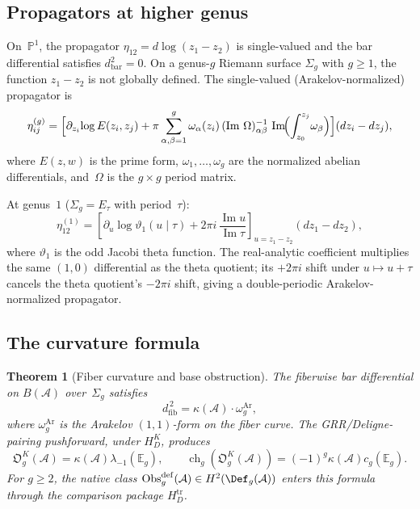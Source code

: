 \documentclass[11pt,reqno]{amsart}
\newtheorem{theorem}{Theorem}[section]
\theoremstyle{definition}
\theoremstyle{remark}
\newcommand{\cA}{\mathcal{A}}
\newcommand{\dfib}{d_{\mathrm{fib}}}
\DeclareMathOperator{\im}{Im}
\numberwithin{equation}{section}
\begin{document}
\subsection{Propagators at higher genus}

On~$\mathbb{P}^1$, the propagator
$\eta_{12} = d\log(z_1 - z_2)$ is single-valued and the bar
differential satisfies $d_{\mathrm{bar}}^2 = 0$. On a
genus-$g$ Riemann surface $\Sigma_g$ with $g \ge 1$, the
function $z_1 - z_2$ is not globally defined. The
single-valued (Arakelov-normalized) propagator is
\begin{equation}\label{eq:propagator-g}
\eta^{(g)}_{ij} = \Bigl[\partial_{z_i}\!\log E(z_i,z_j)
+ \pi\sum_{\alpha,\beta=1}^{g}
\omega_\alpha(z_i)\,(\im\,\Omega)^{-1}_{\alpha\beta}\,
\im\!\Bigl(\int_{z_0}^{z_j}\!\omega_\beta\Bigr)
\Bigr](dz_i - dz_j),
\end{equation}
where $E(z,w)$ is the prime form, $\omega_1,\ldots,\omega_g$
are the normalized abelian differentials, and~$\Omega$ is the
$g\times g$ period matrix.

At genus~$1$ ($\Sigma_g = E_\tau$ with period~$\tau$):
\begin{equation}\label{eq:propagator-1}
\eta^{(1)}_{12}
=
\left[
\partial_u\log\vartheta_1(u\mid\tau)
+2\pi i\,\frac{\im u}{\im\tau}
\right]_{u=z_1-z_2}
(dz_1-dz_2),
\end{equation}
where $\vartheta_1$ is the odd Jacobi theta function. The
real-analytic coefficient multiplies the same $(1,0)$ differential as
the theta quotient; its $+2\pi i$ shift under $u\mapsto u+\tau$
cancels the theta quotient's $-2\pi i$ shift, giving a
double-periodic Arakelov-normalized propagator.

\subsection{The curvature formula}

\begin{theorem}[Fiber curvature and base obstruction]\label{thm:curvature}
The fiberwise bar differential on $B(\cA)$ over~$\Sigma_g$
satisfies
\begin{equation}\label{eq:curvature}
\dfib^{\,2} = \kappa(\cA)\cdot\omega_g^{\mathrm{Ar}},
\end{equation}
where $\omega_g^{\mathrm{Ar}}$ is the Arakelov $(1,1)$-form on the
fiber curve. The GRR/Deligne-pairing pushforward, under $H_D^K$,
produces
\[
 \mathfrak O_g^K(\cA)=\kappa(\cA)\lambda_{-1}(\mathbb E_g),
 \qquad
 \operatorname{ch}_g(\mathfrak O_g^K(\cA))
 =(-1)^g\kappa(\cA)c_g(\mathbb E_g).
\]
For $g\geq2$, the native class
$\operatorname{Obs}^{\mathrm{def}}_g(\cA)\in H^2(\Def_g(\cA))$
enters this formula through the comparison package
$H_D^{\mathrm{tr}}$.
\end{theorem}
\end{document}
